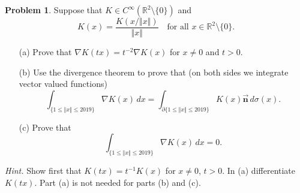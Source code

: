\documentclass[11pt]{article}
\theoremstyle{definition}
\newtheorem{problem}{Problem}
\theoremstyle{definition}
\begin{document}
\medskip

\begin{problem}
Suppose that $K\in C^\infty(\mathbb{R}^2\setminus \{ 0\})$ and
$$
K(x)=\frac{K(x/\Vert x\Vert)}{\Vert x\Vert}
\quad
\text{for all $x\in\mathbb{R}^2\setminus\{0\}$.}
$$
\begin{itemize}
	\item[(a)] Prove that $\nabla K(tx)=t^{-2}\nabla K(x)$ for $x\neq 0$ and $t>0$.
	\item[(b)] Use the divergence theorem to prove that (on both sides we integrate vector valued functions)
	$$
	\int_{\{1\leq \Vert x\Vert\leq 2019\}} \nabla K(x)\, dx=
	\int_{\partial \{1\leq \Vert x\Vert\leq 2019\}} K(x)\vec{\mathbf{n}}\, d\sigma(x).
	$$
	\item[(c)] Prove that
	$$
	\int_{\{1\leq \Vert x\Vert\leq 2019\}} \nabla K(x)\, dx=0.
	$$
\end{itemize}
{\em Hint.} Show first that $K(tx) = t^{-1}K(x)$ for $x\neq 0$, $t>0$. In (a) differentiate $K(tx)$. Part (a) is not needed for parts (b) and (c).
\end{problem}
\end{document}
